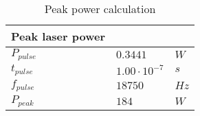 
\begin{table}[H]
\centering
\caption{Peak power calculation}
\label{tab:p_peak}
\begin{tabular}{|l|ll|} \hline
\textbf{Peak laser power} &             &    \\ \hline
$P_{pulse}                 $&$ 0.3441 $&$ W  $\\
$t_{pulse}                  $&$ 1.00\cdot10^{-7}    $&$ s  $\\
$f_{pulse}                  $&$ 18750       $&$ Hz $\\
$P_{peak}                  $&$ 184         $&$ W  $\\ \hline
\end{tabular}
\end{table}